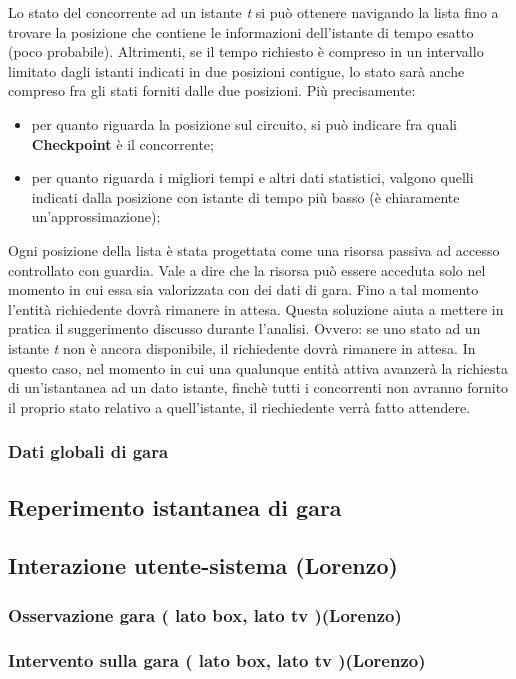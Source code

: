      Lo stato del concorrente ad un istante \emph{t} si può ottenere navigando la lista fino a trovare la posizione che contiene le informazioni
     dell'istante di tempo esatto (poco probabile). Altrimenti, se il tempo richiesto è compreso in un intervallo limitato dagli istanti
     indicati in due posizioni contigue, lo stato sarà anche compreso fra gli stati forniti dalle due posizioni. Più precisamente:\\
     \begin{itemize}
     \item per quanto riguarda la posizione sul circuito, si può indicare fra quali \textbf{Checkpoint} è il concorrente;
     \item per quanto riguarda i migliori tempi e altri dati statistici, valgono quelli indicati dalla posizione con istante di tempo più basso (è chiaramente
     un'approssimazione);
     \end{itemize}
     Ogni posizione della lista è stata progettata come una risorsa passiva ad accesso controllato con guardia. Vale a dire che la risorsa può
     essere acceduta solo nel momento in cui essa sia valorizzata con dei dati di gara. Fino a tal momento l'entità richiedente dovrà rimanere
     in attesa. Questa soluzione aiuta a mettere in pratica il suggerimento discusso durante l'analisi. Ovvero: se uno stato ad un istante
     \emph{t} non è ancora disponibile, il richiedente dovrà rimanere in attesa. In questo caso, nel momento in cui una qualunque entità attiva
     avanzerà la richiesta di un'istantanea ad un dato istante, finchè tutti i concorrenti non avranno fornito il proprio stato relativo 
     a quell'istante, il riechiedente verrà fatto attendere.
     \subsubsection{Dati globali di gara}
     
\subsection{Reperimento istantanea di gara}
\subsection{Interazione utente-sistema (Lorenzo)}
     \subsubsection{Osservazione gara ( lato box, lato tv )(Lorenzo)}
     \subsubsection{Intervento sulla gara ( lato box, lato tv )(Lorenzo)}